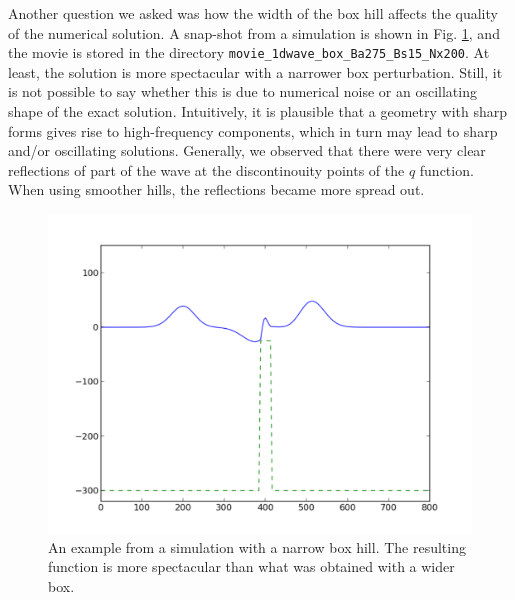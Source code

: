 \documentclass[twoside]{article}
\begin{document}
Another question we asked was how the width of the box hill affects the quality of the numerical solution. A snap-shot from a simulation is shown in Fig. \ref{fig:box_1d_narrow}, and the movie is stored in the directory \verb+movie_1dwave_box_Ba275_Bs15_Nx200+. At least, the solution is more spectacular with a narrower box perturbation. Still, it is not possible to say whether this is due to numerical noise or an oscillating shape of the exact solution. Intuitively, it is plausible that a geometry with sharp forms gives rise to high-frequency components, which in turn may lead to sharp and/or oscillating solutions. Generally, we observed that there were very clear reflections of part of the wave at the discontinouity points of the $q$ function. When using smoother hills, the reflections became more spread out.

\begin{figure} 
  \centering
  \includegraphics[scale=0.4]{gustavs_codes/movie_1dwave_box_Ba275_Bs15_Nx200/figure.pdf}
  \caption{An example from a simulation with a narrow box hill. The resulting function is more spectacular than what was obtained with a wider box.} \label{fig:box_1d_narrow}
\end{figure}
\end{document}
